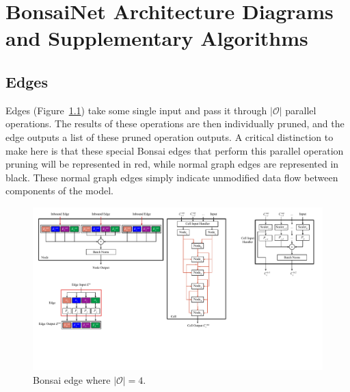 
\graphicspath{{Chapters/appendix_bonsai/figures/}}
\chapter{BonsaiNet Architecture Diagrams and Supplementary Algorithms} \label{chapter:bonsai_architectures}
\section{Edges} \label{sect:bonsai_appendix_edges}
Edges (Figure~\ref{fig:bonsai_edge}) take some single input and pass it through $|\mathcal{O}|$ parallel operations.
The results of these operations are then individually pruned, and the edge outputs a list of these pruned operation outputs.
A critical distinction to make here is that these special Bonsai edges that perform this parallel operation pruning will
be represented in \color{red}red\color{black}, while normal graph edges are represented in black. These
normal graph edges simply indicate unmodified data flow between components of the model.
\begin{figure}[ht]
	\centering
	 \hspace*{-3cm}\includegraphics[width=.6\textwidth]{edge}
	\caption[Bonsai edge where $|\mathcal{O}|=4$]{Bonsai edge where $|\mathcal{O}|=4$.}
	\label{fig:bonsai_edge}
\end{figure}
\vspace{-1cm}
\newpage
